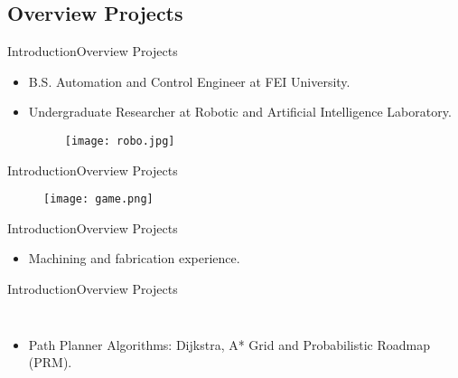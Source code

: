 \documentclass[10pt]{beamer}
\begin{document}
\subsection{Overview Projects}
\begin{frame}{Introduction}{Overview Projects}
\begin{itemize}[<+->]
	\item B.S. Automation and Control Engineer at FEI University.
	\item Undergraduate Researcher at Robotic and Artificial Intelligence Laboratory.	
	\begin{figure}
		\texttt{[image: robo.jpg]}	
	\end{figure}
\end{itemize}
\end{frame}
\begin{frame}{Introduction}{Overview Projects}
	\begin{figure}
	\centering
	\texttt{[image: game.png]}
	\end{figure}
\end{frame}
\begin{frame}{Introduction}{Overview Projects}
\begin{itemize}
	\item Machining and fabrication experience. 
	\begin{figure}
	\centering
	\end{figure}
\end{itemize}
\end{frame}
\begin{frame}{Introduction}{Overview Projects}
\begin{columns}
\begin{minipage}[c][0.3\textheight][c]{\linewidth}
\begin{itemize}
	\item Path Planner Algorithms: Dijkstra, A* Grid and Probabilistic Roadmap (PRM).
\end{itemize}
\end{minipage}
\begin{minipage}[c][0.4\textheight][c]{\linewidth}
  \centering
\end{minipage}
\begin{minipage}[c][0.4\textheight][c]{\linewidth}
	\centering
\end{minipage}
\begin{minipage}[c][0.4\textheight][c]{\linewidth}
  \centering
\end{minipage}
\end{columns}
\end{frame}
\end{document}

